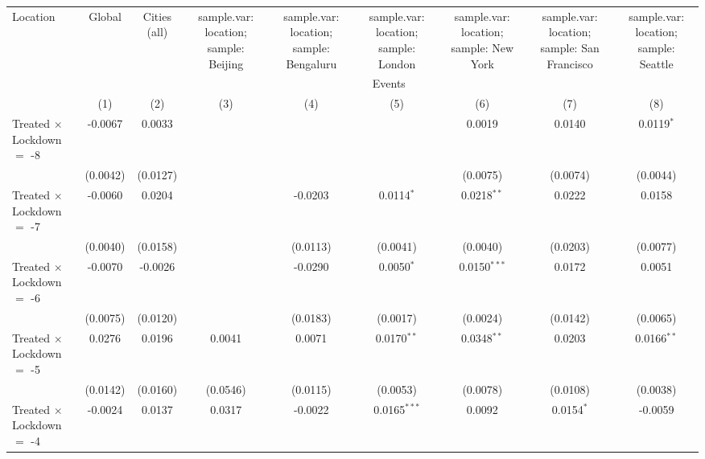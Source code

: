 
\begingroup
\centering
\begin{tabular}{lcccccccc}
   \toprule
   Location & Global & Cities (all) & sample.var: location; sample: Beijing & sample.var: location; sample: Bengaluru & sample.var: location; sample: London & sample.var: location; sample: New York & sample.var: location; sample: San Francisco & sample.var: location; sample: Seattle \\ \cmidrule(lr){2-2} \cmidrule(lr){3-3} \cmidrule(lr){4-4} \cmidrule(lr){5-5} \cmidrule(lr){6-6} \cmidrule(lr){7-7} \cmidrule(lr){8-8} \cmidrule(lr){9-9}
    & \multicolumn{8}{c}{Events}\\
                                     & (1)            & (2)            & (3)           & (4)            & (5)            & (6)            & (7)            & (8)\\  
   \midrule 
   Treated $\times$ Lockdown $=$ -8  & -0.0067        & 0.0033         &               &                &                & 0.0019         & 0.0140         & 0.0119$^{*}$\\   
                                     & (0.0042)       & (0.0127)       &               &                &                & (0.0075)       & (0.0074)       & (0.0044)\\   
   Treated $\times$ Lockdown $=$ -7  & -0.0060        & 0.0204         &               & -0.0203        & 0.0114$^{*}$   & 0.0218$^{**}$  & 0.0222         & 0.0158\\   
                                     & (0.0040)       & (0.0158)       &               & (0.0113)       & (0.0041)       & (0.0040)       & (0.0203)       & (0.0077)\\   
   Treated $\times$ Lockdown $=$ -6  & -0.0070        & -0.0026        &               & -0.0290        & 0.0050$^{*}$   & 0.0150$^{***}$ & 0.0172         & 0.0051\\   
                                     & (0.0075)       & (0.0120)       &               & (0.0183)       & (0.0017)       & (0.0024)       & (0.0142)       & (0.0065)\\   
   Treated $\times$ Lockdown $=$ -5  & 0.0276         & 0.0196         & 0.0041        & 0.0071         & 0.0170$^{**}$  & 0.0348$^{**}$  & 0.0203         & 0.0166$^{**}$\\   
                                     & (0.0142)       & (0.0160)       & (0.0546)      & (0.0115)       & (0.0053)       & (0.0078)       & (0.0108)       & (0.0038)\\   
   Treated $\times$ Lockdown $=$ -4  & -0.0024        & 0.0137         & 0.0317        & -0.0022        & 0.0165$^{***}$ & 0.0092         & 0.0154$^{*}$   & -0.0059\\   

\end{tabular}
